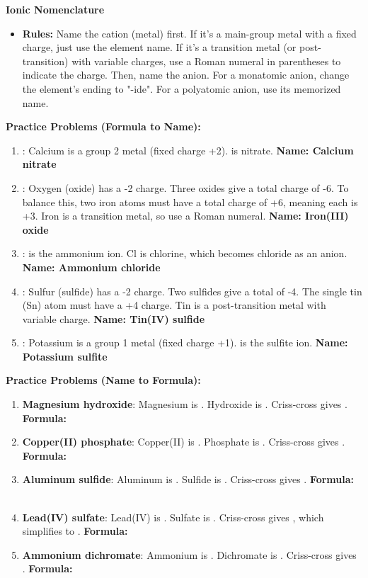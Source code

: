 \documentclass{article}
\begin{document}
\textbf{Ionic Nomenclature}
\begin{itemize}[itemsep=5pt]
    \item \textbf{Rules:} Name the cation (metal) first. If it's a main-group metal with a fixed charge, just use the element name. If it's a transition metal (or post-transition) with variable charges, use a Roman numeral in parentheses to indicate the charge. Then, name the anion. For a monatomic anion, change the element's ending to "-ide". For a polyatomic anion, use its memorized name.
\end{itemize}

\textbf{Practice Problems (Formula to Name):}
\begin{enumerate}[itemsep=5pt]
    \item {}: Calcium is a group 2 metal (fixed charge +2).  is nitrate. \textbf{Name: Calcium nitrate}
    \item {}: Oxygen (oxide) has a -2 charge. Three oxides give a total charge of -6. To balance this, two iron atoms must have a total charge of +6, meaning each is +3. Iron is a transition metal, so use a Roman numeral. \textbf{Name: Iron(III) oxide}
    \item {}:  is the ammonium ion. Cl is chlorine, which becomes chloride as an anion. \textbf{Name: Ammonium chloride}
    \item {}: Sulfur (sulfide) has a -2 charge. Two sulfides give a total of -4. The single tin (Sn) atom must have a +4 charge. Tin is a post-transition metal with variable charge. \textbf{Name: Tin(IV) sulfide}
    \item {}: Potassium is a group 1 metal (fixed charge +1).  is the sulfite ion. \textbf{Name: Potassium sulfite}
\end{enumerate}

\textbf{Practice Problems (Name to Formula):}
\begin{enumerate}[itemsep=5pt]
    \item \textbf{Magnesium hydroxide}: Magnesium is . Hydroxide is . Criss-cross gives . \textbf{Formula: }
    \item \textbf{Copper(II) phosphate}: Copper(II) is . Phosphate is . Criss-cross gives . \textbf{Formula: }
    \item \textbf{Aluminum sulfide}: Aluminum is . Sulfide is . Criss-cross gives . \textbf{Formula: }
    \item \textbf{Lead(IV) sulfate}: Lead(IV) is . Sulfate is . Criss-cross gives , which simplifies to . \textbf{Formula: }
    \item \textbf{Ammonium dichromate}: Ammonium is . Dichromate is . Criss-cross gives . \textbf{Formula: }
\end{enumerate}
\end{document}
